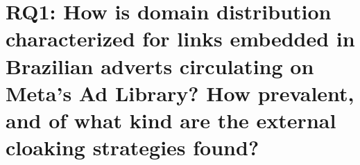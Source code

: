 
\section{RQ1: How is domain distribution characterized for links embedded in Brazilian adverts circulating on Meta's Ad Library? How prevalent, and of what kind are the external cloaking strategies found?}

